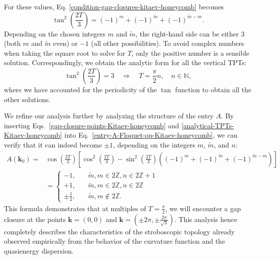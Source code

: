 \documentclass[aps,prb,twocolumn,superscriptaddress,groupedaddress]{revtex4}
\begin{document}
For these values, Eq. \eqref{condition-gap-closures-kitaev-honeycomb} becomes
%
\begin{equation}
\tan^2 \left( \frac{2T}{3} \right) = (-1)^m + (-1)^{\tilde{m}} + (-1)^{\tilde{m}-m}.
\end{equation}
%
Depending on the chosen integers $m$ and $\tilde{m}$, the right-hand side can be either $3$ (both $m$ and $\tilde{m}$ even) or $-1$ (all other possibilities). 
To avoid complex numbers when taking the square root to solve for $T$, only the positive number is a sensible solution.
Correspondingly, we obtain the analytic form for all the vertical TPTs:
%
\begin{equation}
\tan^2 \left( \frac{2T}{3}\right) = 3 \quad \Rightarrow \quad T = \frac{\pi}{2} n, \quad n \in \mathbb{N},
\label{analytical-TPTs-Kitaev-honeycomb}
\end{equation}
%
where we have accounted for the periodicity of the $\tan$ function to obtain all the other solutions.

We refine our analysis further by analyzing the structure of the entry $A$.
By inserting Eqs.~\eqref{gap-closure-points-Kitaev-honeycomb} and \eqref{analytical-TPTs-Kitaev-honeycomb} into Eq.~\eqref{entry-A-Floquet-op-Kitaev-honeycomb}, we can verify that it can indeed become $\pm 1$, depending on the integers $m$, $\tilde{m}$, and $n$:
%
\begin{align}
A(\mathbf{k}_0) =& {\scriptstyle \cos \left( \frac{2T}{3} \right) \left[  \cos^2 \left( \frac{2T}{3} \right) - \sin^2 \left( \frac{2T}{3} \right) \left( (-1)^m + (-1)^{\tilde{m}} + (-1)^{\tilde{m} - m}  \right) \right]} \nonumber \\
&= \begin{cases}
-1, \quad &\tilde{m}, m \in 2\mathbb{Z}, n \in 2\mathbb{Z}+1 \\
+1, \quad &\tilde{m}, m \in 2\mathbb{Z}, n \in 2\mathbb{Z} \\
\pm \frac{1}{2}, \quad &\tilde{m}, m \notin 2\mathbb{Z}.
\end{cases}
\end{align}
%
This formula demonstrates that at multiples of $T=\frac{\pi}{2}$, we will encounter a gap closure at the points $\mathbf{k} = (0,0)$ and $\mathbf{k} = (\pm 2\pi , \pm \frac{2\pi}{\sqrt{3}})$.
This analysis hence completely describes the characteristics of the stroboscopic topology already observed empirically from the behavior of the curvature function and the quasienergy dispersion.


\newpage

\end{document}
